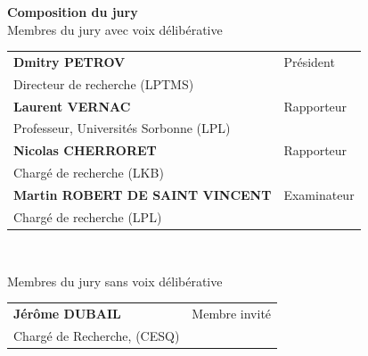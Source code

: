 \documentclass[french,12pt,a4paper]{book}
\begin{document}
\begin{titlepage}
\flushleft
{\color{Prune} 
\fontsize{12}{12}\selectfont
\textbf{Composition du jury}
}\\
\smallskip
{\color{Prune} %
\fontsize{9}{12}\selectfont 
{Membres du jury avec voix délibérative}} \\
\vspace{2mm}
{\color{black}
\fontsize{10}{12}\selectfont
\begin{tabular}{|p{7cm}l}
\arrayrulecolor{Prune}
{\textbf{Dmitry PETROV}} &  {Président} \\ 
{Directeur de recherche (LPTMS)}   &   \\ 
{\textbf{Laurent VERNAC}} &  Rapporteur \\ 
{ Professeur, Universités Sorbonne (LPL)}  &   \\ 
{\textbf{Nicolas CHERRORET}} &  {Rapporteur} \\ 
{Chargé de recherche (LKB)}  &   \\ 
{\textbf{Martin ROBERT DE SAINT VINCENT} }&  {Examinateur}\\ 
{ Chargé de recherche (LPL)}  &   \\ 
\end{tabular} \\
}

\medskip
\vspace{2mm}

{\color{Prune} %
\fontsize{9}{12}\selectfont 
{Membres du jury sans voix délibérative}} \\
\vspace{2mm}
{\color{black}
\fontsize{10}{12}\selectfont
\begin{tabular}{|p{7cm}l}
\arrayrulecolor{Prune}
{\textbf{Jérôme DUBAIL}} &  {Membre invité} \\%
{Chargé de Recherche, (CESQ)}  &   \\ 
\end{tabular} 
}



\end{titlepage}


\thispagestyle{empty}
\end{document}
